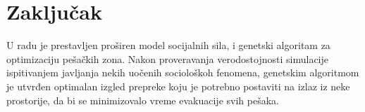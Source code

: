 \documentclass[12pt]{article}
\begin{document}
\section{Zaključak}

U radu je prestavljen proširen model socijalnih sila, i genetski algoritam za optimizaciju pešačkih zona. Nakon proveravanja verodostojnosti simulacije ispitivanjem javljanja nekih uočenih sociološkoh fenomena, genetskim algoritmom je utvrđen optimalan izgled prepreke koju je potrebno postaviti na izlaz iz neke prostorije, da bi se minimizovalo vreme evakuacije svih pešaka.

  
\begin{scriptsize}

\end{scriptsize}
\end{document}
